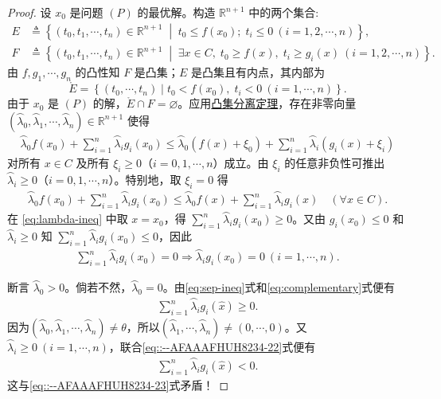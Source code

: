 \documentclass[../../main.tex]{subfiles}%
\begin{document}
\begin{proof}
设 $x_0$ 是问题 $(P)$ 的最优解。构造 $\mathbb{R}^{n+1}$ 中的两个集合:
\begin{align*}
E &\triangleq \left\{ (t_0, t_1, \cdots, t_n) \in \mathbb{R}^{n+1} \;\middle|\; t_0 \leqslant f(x_0);\; t_i \leqslant 0 \ (i=1,2,\cdots,n) \right\}, \\
F &\triangleq \left\{ (t_0, t_1, \cdots, t_n) \in \mathbb{R}^{n+1} \;\middle|\; \exists x \in C,\; t_0 \geqslant f(x),\; t_i \geqslant g_i(x) \ (i=1,2,\cdots,n) \right\}.
\end{align*}
由 $f, g_1, \cdots, g_n$ 的凸性知 $F$ 是凸集；$E$ 是凸集且有内点，其内部为
\[
\mathring{E} = \left\{ (t_0, \cdots, t_n) \mid t_0 < f(x_0),\; t_i < 0 \ (i=1,\cdots,n) \right\}.
\]
由于 $x_0$ 是 $(P)$ 的解，$\mathring{E} \cap F = \varnothing$。应用\hyperref[theorem:泛函分析--凸集分离定理]{凸集分离定理}，存在非零向量 $(\wideparen{\lambda}_0, \wideparen{\lambda}_1, \cdots, \wideparen{\lambda}_n) \in \mathbb{R}^{n+1}$ 使得
\begin{align}\label{eq:sep-ineq}
\wideparen{\lambda}_0 f(x_0) + \sum_{i=1}^n \wideparen{\lambda}_i g_i(x_0) \leqslant \wideparen{\lambda}_0 (f(x)+\xi_0) + \sum_{i=1}^n \wideparen{\lambda}_i (g_i(x)+\xi_i)
\end{align}
对所有 $x \in C$ 及所有 $\xi_i \geqslant 0$（$i=0,1,\cdots,n$）成立。由 $\xi_i$ 的任意非负性可推出 $\wideparen{\lambda}_i \geqslant 0$（$i=0,1,\cdots,n$）。特别地，取 $\xi_i=0$ 得
\begin{align}\label{eq:lambda-ineq}
\wideparen{\lambda}_0 f(x_0) + \sum_{i=1}^n \wideparen{\lambda}_i g_i(x_0) \leqslant \wideparen{\lambda}_0 f(x) + \sum_{i=1}^n \wideparen{\lambda}_i g_i(x) \quad (\forall x \in C).
\end{align}
在 \eqref{eq:lambda-ineq} 中取 $x = x_0$，得 $\sum_{i=1}^n \wideparen{\lambda}_i g_i(x_0) \geqslant 0$。又由 $g_i(x_0) \leqslant 0$ 和 $\wideparen{\lambda}_i \geqslant 0$ 知 $\sum_{i=1}^n \wideparen{\lambda}_i g_i(x_0) \leqslant 0$，因此
\begin{align}\label{eq:complementary}
\sum_{i=1}^n \wideparen{\lambda}_i g_i(x_0) = 0\Longrightarrow  \wideparen{\lambda}_i g_i(x_0)=0 \ (i=1,\cdots,n).
\end{align}

断言 $\wideparen{\lambda}_0 > 0$。倘若不然，$\wideparen{\lambda}_0 = 0$。由\eqref{eq:sep-ineq}式和\eqref{eq:complementary}式便有
\begin{align}
\sum\limits_{i=1}^n \wideparen{\lambda}_i g_i(\widehat{x}) \geqslant 0.
\label{eq::--AFAAAFHUH8234-23}
\end{align}
因为$(\wideparen{\lambda}_0, \wideparen{\lambda}_1, \cdots, \wideparen{\lambda}_n) \neq \theta$，所以$(\wideparen{\lambda}_1, \cdots, \wideparen{\lambda}_n) \neq (0,\cdots,0)$。又$\wideparen{\lambda}_i \geqslant 0 \ (i=1,\cdots,n)$，联合\eqref{eq::--AFAAAFHUH8234-22}式便有
\begin{align*}
\sum\limits_{i=1}^n \wideparen{\lambda}_i g_i(\widehat{x}) < 0.
\end{align*}
这与\eqref{eq::--AFAAAFHUH8234-23}式矛盾！


\end{proof}
\end{document}
